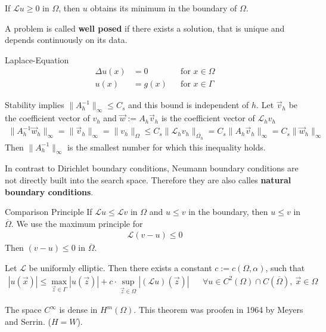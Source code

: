 \documentclass{yannick}
\begin{document}
	\begin{korollar}
		If $\mathcal{L}u\geq 0$ in $\Omega$, then $u$ obtains its minimum in the boundary of $\Omega$.
	\end{korollar} 
	
	\begin{dfn}
		A problem is called \textbf{well posed} if there exists a solution, that is unique and depends continuously on its data.
	\end{dfn}

	\begin{problem}{Laplace-Equation}{
		\begin{align*}
			\Delta u(x)&=0 && \text{for }x\in\Omega \\
			u(x)&=g(x) &&\text{for }x\in \Gamma
		\end{align*}
	}\end{problem}

	\begin{lem}
		{
			 Stability implies $\|A^{-1}_h\|_{\infty }\leq C_s$ and this bound is independent of $h$.
		}
		Let $\vec{v}_h$ be the coefficient vector of $v_h$ and $\vec{w}:= A_h\vec{v}_h $ is the coefficient vector of $\mathcal{L}_hv_h$
		\begin{align*}
			\|A^{-1}_h\vec{w}_h\|_{\infty }=\|\vec{v}_h \|_{\infty}=\|v_h \|_{\Omega}\leq C_s \|\mathcal{L}_hv_h \|_{\overline{\Omega_h}} = C_s\|A_h\vec{v}_h \|_{\infty}=C_s\|\vec{w}_h \|_{\infty}
		\end{align*}			 
		Then $\|A^{-1}_h\|_{\infty }$ is the smallest number for which this inequality holds.
	\end{lem}
		 
	\begin{yannick}{
		In contrast to Dirichlet boundary conditions, Neumann boundary conditions are not directly built into the search space. Therefore they are also calles \textbf{natural boundary conditions}.
	}\end{yannick}	
	
	\begin{lemn}{Comparison Principle}
		{ 
			If $\mathcal{L}u\leq\mathcal{L}v$ in $\Omega$ and $u\leq v$ in the boundary, then $u\leq v$ in $\overline{\Omega}$.
		}
		We use the maximum principle for
		\begin{align*}
			\mathcal{L}(v-u)\leq 0
		\end{align*}
		Then $(v-u)\leq 0$ in $\overline{\Omega}$.
	\end{lemn}
	
	\begin{lemb}
		Let $\mathcal{L}$ be uniformly elliptic. Then there exists a constant $c:=c(\Omega,\alpha)$, such that
		\begin{align*}
			|u(\vec{x})|\leq \max_{\vec{z}\in\Gamma}|u(\vec{z})|+c\cdot\sup_{\vec{z}\in\Omega}|(\mathcal{L}u )(\vec{z})|   &&\forall u\in C^2(\Omega)\cap C(\overline{\Omega}),\ \vec{x}\in\Omega
		\end{align*}
	\end{lemb}
	
	\begin{satz}
		{
	 		The space $C^\infty$ is dense in $H^m(\Omega)$.
	 	}
	 This theorem was proofen in 1964 by Meyers and Serrin. ($H=W$).
	 \end{satz}
\end{document}
